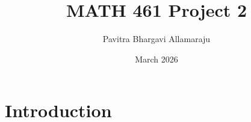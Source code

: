 \documentclass{article}
\title{MATH 461 Project 2}
\author{Pavitra Bhargavi Allamaraju}
\date{March 2026}
\begin{document}
\maketitle

\section{Introduction}
\end{document}
